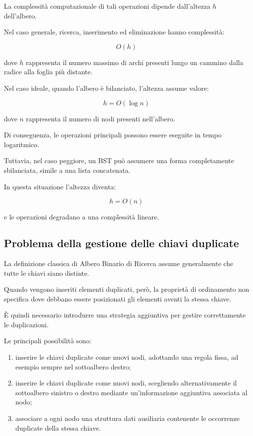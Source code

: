\documentclass[a4paper,12pt]{article}
\begin{document}
La complessità computazionale di tali operazioni dipende dall'altezza $h$ dell'albero.

Nel caso generale, ricerca, inserimento ed eliminazione hanno complessità:

\[
O(h)
\]

dove $h$ rappresenta il numero massimo di archi presenti lungo un cammino dalla radice alla foglia più distante.

Nel caso ideale, quando l'albero è bilanciato, l'altezza assume valore:

\[
h = O(\log n)
\]

dove $n$ rappresenta il numero di nodi presenti nell'albero.

Di conseguenza, le operazioni principali possono essere eseguite in tempo logaritmico.

Tuttavia, nel caso peggiore, un BST può assumere una forma completamente sbilanciata, simile a una lista concatenata.

In questa situazione l'altezza diventa:

\[
h = O(n)
\]

e le operazioni degradano a una complessità lineare.

\subsection{Problema della gestione delle chiavi duplicate}

La definizione classica di Albero Binario di Ricerca assume generalmente che tutte le chiavi siano distinte.

Quando vengono inseriti elementi duplicati, però, la proprietà di ordinamento non specifica dove debbano essere posizionati gli elementi aventi la stessa chiave.

È quindi necessario introdurre una strategia aggiuntiva per gestire correttamente le duplicazioni.

Le principali possibilità sono:

\begin{enumerate}

    \item inserire le chiavi duplicate come nuovi nodi, adottando una regola fissa, ad esempio sempre nel sottoalbero destro;

    \item inserire le chiavi duplicate come nuovi nodi, scegliendo alternativamente il sottoalbero sinistro o destro mediante un'informazione aggiuntiva associata al nodo;

    \item associare a ogni nodo una struttura dati ausiliaria contenente le occorrenze duplicate della stessa chiave.

\end{enumerate}
\end{document}
